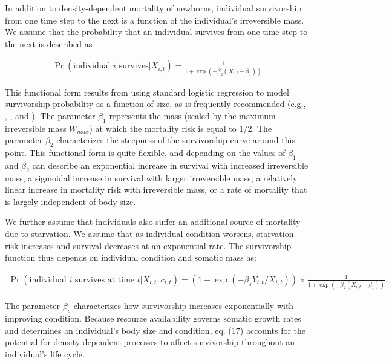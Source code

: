\documentclass[11pt]{article}
\begin{document}
\begin{linenumbers}
\indent In addition to density-dependent mortality of newborns, individual survivorship from one time step to the next is a function of the individual's irreversible mass. We assume that the probability that an individual survives from one time step to the next is described as
\begin{linenomath}
\begin{eqnarray}
\label{eqn:survivorship1}
\Pr(\textrm{individual $i$ survives} | X_{i,t}) = \frac{1}{1+\exp(-\beta_2 (X_{i,t} - \beta_1))}
\end{eqnarray}
\end{linenomath}
This functional form results from using standard logistic regression to model survivorship probability as a function of size, as is frequently recommended (e.g., \citealt{morris02}, \citealt{ellner06}, and \citealt{hesse08}). The parameter $\beta_1$ represents the mass (scaled by the maximum irreversible mass $W_{max}$) at which the mortality risk is equal to 1/2. The parameter $\beta_2$ characterizes the steepness of the survivorship curve around this point. This functional form is quite flexible, and depending on the values of $\beta_1$ and $\beta_2$ can describe an exponential increase in survival with increased irreversible mass, a sigmoidal increase in survival with larger irreversible mass, a relatively linear increase in mortality risk with irreversible mass, or a rate of mortality that is largely independent of body size.

We further assume that individuals also suffer an additional source of mortality due to starvation. We assume that as individual condition worsens, starvation risk increases and survival decreases at an exponential rate. The survivorship function thus depends on individual condition and somatic mass as:
\begin{linenomath}
\begin{eqnarray}
\label{eqn:survivorship}
  \Pr(\textrm{individual $i$ survives at time $t$} | X_{i,t},c_{i,t}) = (1-\exp(-\beta_s Y_{i,t}/X_{i,t})) \times \frac{1}{1+\exp(-\beta_2 (X_{i,t} - \beta_1))}. 
\end{eqnarray}
\end{linenomath}
The parameter $\beta_s$ characterizes how survivorship increases exponentially with improving condition. Because resource availability governs somatic growth rates and determines an individual's body size and condition, eq. (17) accounts for the potential for density-dependent processes to affect survivorship throughout an individual's life cycle.


\end{linenumbers}
\end{document}
